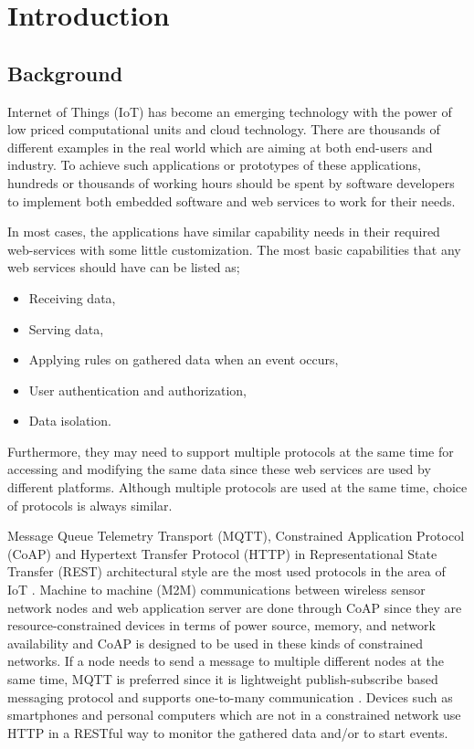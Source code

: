 
\chapter{Introduction}\label{chapter:introduction}

\section{Background}
Internet of Things (IoT) has become an emerging technology with the power of low priced computational units and cloud technology. There are thousands of different examples in the real world which are aiming at both end-users and industry. To achieve such applications or prototypes of these applications, hundreds or thousands of working hours should be spent by software developers to implement both embedded software and web services to work for their needs. 

In most cases, the applications have similar capability needs in their required web-services with some little customization. The most basic capabilities that any web services should have can be listed as;
\begin{itemize}
  \item Receiving data,
  \item Serving data,
  \item Applying rules on gathered data when an event occurs,
  \item User authentication and authorization,
  \item Data isolation.
\end{itemize}
 Furthermore, they may need to support multiple protocols at the same time for accessing and modifying the same data since these web services are used by different platforms. Although multiple protocols are used at the same time, choice of protocols is always similar. 

 Message Queue Telemetry Transport (MQTT), Constrained Application Protocol (CoAP) and Hypertext Transfer Protocol (HTTP) in Representational State Transfer (REST) architectural style are the most used protocols in the area of IoT \cite{8246418,8070130}. Machine to machine (M2M) communications between wireless sensor network nodes and web application server are done through CoAP since they are resource-constrained devices in terms of power source, memory, and network availability and CoAP is designed to be used in these kinds of constrained networks. If a node needs to send a message to multiple different nodes at the same time, MQTT is preferred since it is lightweight publish-subscribe based messaging protocol and supports one-to-many communication \cite{mqtt}. Devices such as smartphones and personal computers which are not in a constrained network use HTTP in a RESTful way to monitor the gathered data and/or to start events.

